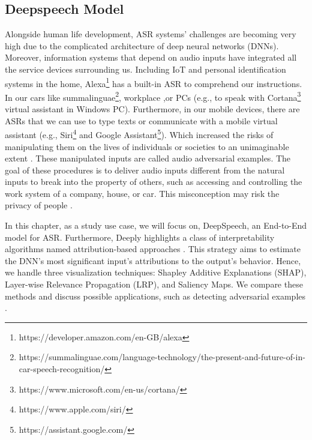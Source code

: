 \subsection{Deepspeech Model}



 
Alongside human life development, ASR systems' challenges are becoming very high due to the complicated architecture of deep neural networks (DNNs). Moreover, information systems that depend on audio inputs have integrated all the service devices surrounding us. Including IoT and personal identification systems in the home, Alexa\footnote{https://developer.amazon.com/en-GB/alexa} has a built-in ASR to comprehend our instructions. In our cars like summalinguae\footnote{https://summalinguae.com/language-technology/the-present-and-future-of-in-car-speech-recognition/}, workplace ,or PCs (e.g., to speak with Cortana\footnote{https://www.microsoft.com/en-us/cortana/} virtual assistant in Windows PC). Furthermore, in our mobile devices, there are ASRs that we can use to type texts or communicate with a mobile virtual assistant (e.g., Siri\footnote{https://www.apple.com/siri/} and Google Assistant\footnote{https://assistant.google.com/}). Which increased the risks of manipulating them on the lives of individuals or societies to an unimaginable extent \cite{hu2019adversarial,abdullah2021sok}. These manipulated inputs are called audio adversarial examples. The goal of these procedures is to deliver audio inputs different from the natural inputs to break into the property of others, such as accessing and controlling the work system of a company, house, or car. This misconception may risk the privacy of people \cite{carlini2018audio,mitev2020leakypick}.

In this chapter, as a study use case, we will focus on, DeepSpeech, an End-to-End model for ASR. Furthermore, Deeply highlights a class of interpretability algorithms named attribution-based approaches \cite{ancona2017towards,sundararajan2017axiomatic}. This strategy aims to estimate the DNN's most significant input's attributions to the output's behavior. Hence, we handle three visualization techniques: Shapley Additive Explanations (SHAP), Layer-wise Relevance Propagation (LRP), and Saliency Maps. We compare these methods and discuss possible applications, such as detecting adversarial examples \cite{carlini2018audio, qin2019imperceptible, dorr2020towards}.



